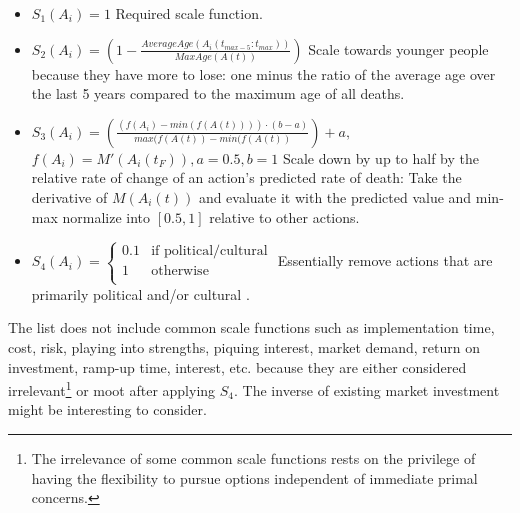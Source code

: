 \documentclass[10pt, a4paper, twocolumn]{IEEEconf}
\begin{document}
\begin{itemize}
  \item $S_1(A_i) = 1$
                  \newline\newline
                  Required scale function.
  \item $S_2(A_i) = \left(1 - \frac{AverageAge(A_i(t_{max-5}:t_{max}))}{MaxAge(A(t))}\right)$
                  \newline\newline
                  Scale towards younger people because they have more to lose: one minus the ratio of the average age \citep{nbermortality} over the last 5 years compared to the maximum age of all deaths.
  \item $S_3(A_i) = \left(\frac{(f(A_i)-min(f(A(t)))) \cdot (b-a)}{max(f(A(t))-min(f(A(t))}\right) + a,$
                  \newline\newline
                  $f(A_i) = M'(A_i(t_F)), a=0.5, b=1$
                  \newline\newline
                  Scale down by up to half by the relative rate of change of an action's predicted rate of death: Take the derivative of $M(A_i(t))$ and evaluate it with the predicted value and min-max normalize into $[0.5,1]$ relative to other actions.
  \item $S_4(A_i) = \begin{cases}\text{0.1} & \mbox{if political/cultural} \\ \text{1} & \mbox{otherwise} \\ \end{cases}$
                  \newline\newline
                  Essentially remove actions that are primarily political and/or cultural \citep{huemer2012praise}.
\end{itemize}

The list does not include common scale functions such as implementation time, cost, risk, playing into strengths, piquing interest, market demand, return on investment, ramp-up time, interest, etc. because they are either considered irrelevant\footnote{The irrelevance of some common scale functions rests on the privilege of having the flexibility to pursue options independent of immediate primal concerns.} or moot after applying $S_4$.
The inverse of existing market investment might be interesting to consider.
\end{document}
